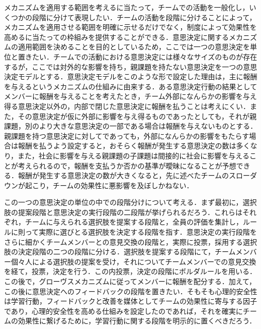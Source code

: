 \documentclass[a4paper, 11pt]{jsarticle}
\begin{document}
メカニズムを適用する範囲を考えるに当たって，チームでの活動を一般化し，いくつかの段階に分けて表現したい．チームの活動を段階に分けることによって，メカニズムを適用させる範囲を明確に示せるだけでなく，制度によって効果性を高めるに当たっての枠組みを提供することができる．意思決定に関するメカニズムの適用範囲を決めることを目的としているため，ここでは一つの意思決定を単位と置きたい．チームでの活動における意思決定には様々なサイズのものが存在するが，ここでは対外的な影響を持ち，親課題を持たない意思決定を一つの意思決定モデルとする．意思決定モデルをこのような形で設定した理由は，主に報酬を与えるというメカニズムの仕組みに由来する．ある意思決定行動の結果としてメンバーに報酬を与えることを考えたとき，チーム外部になんらかの影響を与え得る意思決定以外の，内部で閉じた意思決定に報酬を払うことは考えにくい．また，その意思決定が仮に外部に影響を与え得るものであったとしても，それが親課題，別のより大きな意思決定の一部である場合は報酬を与えないものとする．親課題を持つ意思決定に対してであっても，外部になんらかの影響をもたらす場合は報酬を払うよう設定すると，おそらく報酬が発生する意思決定の数は多くなり，また，社会に影響を与える親課題の子課題は間接的に社会に影響を与えることが考えられるので，報酬を支払うか否かの基準が曖昧になることが予想できる．報酬が発生する意思決定の数が大きくなると，先に述べたチームのスローダウンが起こり，チームの効果性に悪影響を及ぼしかねない．

この一つの意思決定の単位の中での段階分けについて考える．まず最初に，選択肢の提案段階と意思決定の実行段階の二段階が挙げられるだろう．これらはそれぞれ，チームに与えられる選択肢を提案する段階と，全員の評価を集計し，ルールに則って実際に選びとる選択肢を決定する段階を指す．意思決定の実行段階をさらに細かくチームメンバーとの意見交換の段階と，実際に投票，採用する選択肢の決定段階の二つの段階に分ける．選択肢を提案する段階にて，チームメンバー個々人による選択肢の提案を受け，それについてチームメンバーでの意見交換を経て，投票，決定を行う．この内投票，決定の段階にボルダルールを用いる．この後で，グローヴスメカニズムに従ってメンバーに報酬を配分する．加えて，この後に意思決定へのフィードバックの段階を置きたい．そもそも心理的安全性は学習行動，フィードバックと改善を媒体としてチームの効果性に寄与する因子であり，心理的安全性を高める仕組みを設定したのであれば，それを確実にチームの効果性に繋げるために，学習行動に関する段階を明示的に置くべきだろう．
\end{document}
